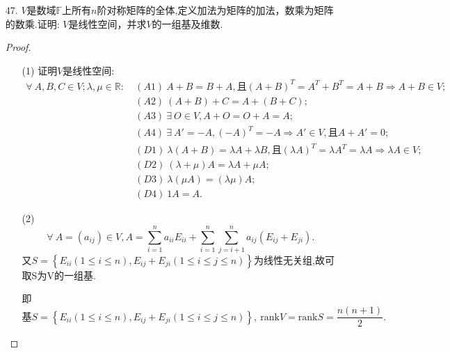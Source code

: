 \documentclass{article}
\begin{document}
\begin{enumerate}
\begin{proof}
\begin{enumerate}
\[                \Rightarrow
                (b_0,b_1,\ldots,b_n)=
                \left(\sum\limits_{i=0}^{n} C_{i}^{0} a_i,\sum\limits_{i=1}^{n} C_{i}^{1} a_i,\ldots,\sum\limits_{i=n}^n C_{i}^{n} a_n \right)
            \]
        \end{enumerate}
    \end{proof}
    \item [47.]$V$是数域$\mathbb{F}$上所有$n$阶对称矩阵的全体,定义加法为矩阵的加法，数乘为矩阵的数乘.证明: $V$是线性空间，并求$V$的一组基及维数. 
    \begin{proof}
        \begin{enumerate}
            \item []
            \item [(1)]证明$V$是线性空间:
            \begin{align*}
                \forall\ A,B,C\in V;\lambda,\mu \in \mathbb{R}:
                &\ (A1)\ A+B=B+A,\mbox{且}{(A+B)}^T=A^T+B^T=A+B \Rightarrow A+B\in V;\\
                &\ (A2)\ (A+B)+C=A+(B+C);\\
                &\ (A3)\ \exists\ O\in V,A+O=O+A=A;\\
                &\ (A4)\ \exists\ A'=-A,{(-A)}^T=-A\Rightarrow A'\in V,\mbox{且}A+A'=0;\\
                &\ (D1)\ \lambda(A+B)=\lambda A+\lambda B,\mbox{且} {(\lambda A)}^T=\lambda A^T=\lambda A \Rightarrow \lambda A\in V;\\
                &\ (D2)\ (\lambda+\mu)A=\lambda A+\mu A;\\
                &\ (D3)\ \lambda(\mu A)=(\lambda \mu)A;\\
                &\ (D4)\ 1A=A.
            \end{align*}
            \item [(2)]
            \[
                \forall\ A=(a_{ij})\in V,
                A=\sum\limits_{i=1}^n a_{ii}E_{ii}+\sum\limits_{i=1}^n \sum\limits_{j=i+1}^n a_{ij}(E_{ij}+E_{ji}).
            \]
            又$S=\left\{E_{ii}(1\leq i\leq n),E_{ij}+E_{ji}(1\leq i\leq j\leq n)\right\}$为线性无关组,故可取S为V的一组基.
            
            即
            \[
                \mbox{基}S=\left\{E_{ii}(1\leq i\leq n),E_{ij}+E_{ji}(1\leq i\leq j\leq n)\right\},\
                \mbox{rank}V=\mbox{rank}S=\displaystyle{\frac{n(n+1)}{2}}.
            \]
        \end{enumerate}
    \end{proof}
\end{enumerate}
\end{document}
